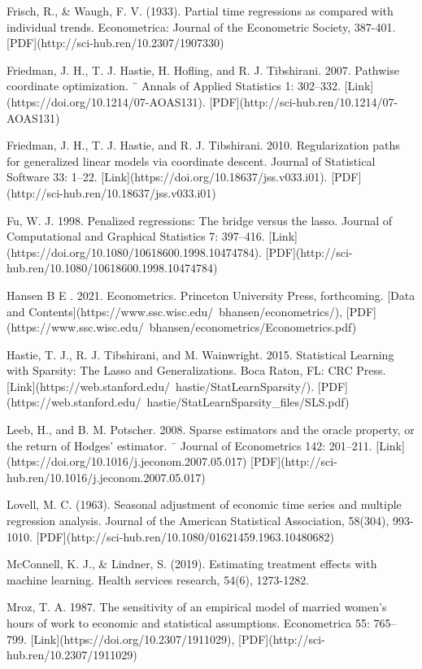 {Frisch, R., \& Waugh, F. V. (1933). Partial time regressions as compared with individual trends. Econometrica: Journal of the Econometric Society, 387-401. [PDF](http://sci-hub.ren/10.2307/1907330) 

Friedman, J. H., T. J. Hastie, H. Hofling, and R. J. Tibshirani. 2007. Pathwise coordinate optimization. ¨ Annals of
Applied Statistics 1: 302–332. [Link](https://doi.org/10.1214/07-AOAS131). [PDF](http://sci-hub.ren/10.1214/07-AOAS131)

Friedman, J. H., T. J. Hastie, and R. J. Tibshirani. 2010. Regularization paths for generalized linear models via
coordinate descent. Journal of Statistical Software 33: 1–22. [Link](https://doi.org/10.18637/jss.v033.i01). [PDF](http://sci-hub.ren/10.18637/jss.v033.i01)

Fu, W. J. 1998. Penalized regressions: The bridge versus the lasso. Journal of Computational and Graphical Statistics
7: 397–416. [Link](https://doi.org/10.1080/10618600.1998.10474784). [PDF](http://sci-hub.ren/10.1080/10618600.1998.10474784)

Hansen B E . 2021. Econometrics. Princeton University Press, forthcoming. [Data and Contents](https://www.ssc.wisc.edu/~bhansen/econometrics/), [PDF](https://www.ssc.wisc.edu/~bhansen/econometrics/Econometrics.pdf)

Hastie, T. J., R. J. Tibshirani, and M. Wainwright. 2015. Statistical Learning with Sparsity: The Lasso and
Generalizations. Boca Raton, FL: CRC Press. [Link](https://web.stanford.edu/~hastie/StatLearnSparsity/). [PDF](https://web.stanford.edu/~hastie/StatLearnSparsity_files/SLS.pdf)

Leeb, H., and B. M. Potscher. 2008. Sparse estimators and the oracle property, or the return of Hodges’ estimator. ¨
Journal of Econometrics 142: 201–211. [Link](https://doi.org/10.1016/j.jeconom.2007.05.017) [PDF](http://sci-hub.ren/10.1016/j.jeconom.2007.05.017)

Lovell, M. C. (1963). Seasonal adjustment of economic time series and multiple regression analysis. Journal of the American Statistical Association, 58(304), 993-1010. [PDF](http://sci-hub.ren/10.1080/01621459.1963.10480682)

McConnell, K. J., \& Lindner, S. (2019). Estimating treatment effects with machine learning. Health services research, 54(6), 1273-1282.

Mroz, T. A. 1987. The sensitivity of an empirical model of married women’s hours of work to economic and statistical
assumptions. Econometrica 55: 765–799. [Link](https://doi.org/10.2307/1911029), [PDF](http://sci-hub.ren/10.2307/1911029)


}
